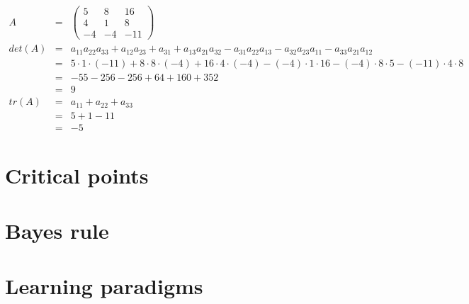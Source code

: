 \documentclass[11pt,a4paper]{article}
\begin{document}
\begin{eqnarray*}
A   &   = & \begin{pmatrix}
  5 &   8 &  16\\
  4 &   1 &   8\\
 -4 &  -4 & -11
\end{pmatrix}\\
det(A)  &   = & a_{11} a_{22} a_{33} + a_{12} a_{23} + a_{31} + a_{13} a_{21} a_{32}
            - a_{31} a_{22} a_{13} - a_{32} a_{23} a_{11} - a_{33} a_{21} a_{12}\\
        &   = & 5 \cdot 1 \cdot (-11) + 8 \cdot 8 \cdot (-4) + 16 \cdot 4 \cdot (-4)
            - (-4) \cdot 1 \cdot 16 - (-4) \cdot 8 \cdot 5 - (-11) \cdot 4 \cdot 8\\
        &   = & -55 - 256 - 256 + 64 + 160 + 352\\
        &   = & 9\\
tr(A)   &   = & a_{11} + a_{22} + a_{33}\\
        &   = & 5 + 1 - 11\\
        &   = & -5
\end{eqnarray*}

\section{Critical points}

\section{Bayes rule}

\section{Learning paradigms}
\end{document}
